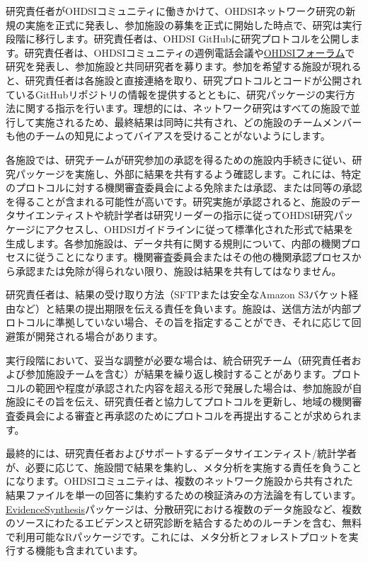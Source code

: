 \documentclass[
  11pt]{book}
\theoremstyle{definition}
\theoremstyle{definition}
\theoremstyle{definition}
\theoremstyle{definition}
\theoremstyle{remark}
\begin{document}
研究責任者がOHDSIコミュニティに働きかけて、OHDSIネットワーク研究の新規の実施を正式に発表し、参加施設の募集を正式に開始した時点で、研究は実行段階に移行します。研究責任者は、OHDSI GitHubに研究プロトコルを公開します。研究責任者は、OHDSIコミュニティの週例電話会議や\href{http://forums.ohdsi.org/}{OHDSIフォーラム}で研究を発表し、参加施設と共同研究者を募ります。参加を希望する施設が現れると、研究責任者は各施設と直接連絡を取り、研究プロトコルとコードが公開されているGitHubリポジトリの情報を提供するとともに、研究パッケージの実行方法に関する指示を行います。理想的には、ネットワーク研究はすべての施設で並行して実施されるため、最終結果は同時に共有され、どの施設のチームメンバーも他のチームの知見によってバイアスを受けることがないようにします。

各施設では、研究チームが研究参加の承認を得るための施設内手続きに従い、研究パッケージを実施し、外部に結果を共有するよう確認します。これには、特定のプロトコルに対する機関審査委員会による免除または承認、または同等の承認を得ることが含まれる可能性が高いです。研究実施が承認されると、施設のデータサイエンティストや統計学者は研究リーダーの指示に従ってOHDSI研究パッケージにアクセスし、OHDSIガイドラインに従って標準化された形式で結果を生成します。各参加施設は、データ共有に関する規則について、内部の機関プロセスに従うことになります。機関審査委員会またはその他の機関承認プロセスから承認または免除が得られない限り、施設は結果を共有してはなりません。

研究責任者は、結果の受け取り方法（SFTPまたは安全なAmazon S3バケット経由など）と結果の提出期限を伝える責任を負います。施設は、送信方法が内部プロトコルに準拠していない場合、その旨を指定することができ、それに応じて回避策が開発される場合があります。

実行段階において、妥当な調整が必要な場合は、統合研究チーム（研究責任者および参加施設チームを含む）が結果を繰り返し検討することがあります。プロトコルの範囲や程度が承認された内容を超える形で発展した場合は、参加施設が自施設にその旨を伝え、研究責任者と協力してプロトコルを更新し、地域の機関審査委員会による審査と再承認のためにプロトコルを再提出することが求められます。

最終的には、研究責任者およびサポートするデータサイエンティスト/統計学者が、必要に応じて、施設間で結果を集約し、メタ分析を実施する責任を負うことになります。OHDSIコミュニティは、複数のネットワーク施設から共有された結果ファイルを単一の回答に集約するための検証済みの方法論を有しています。\href{https://github.com/OHDSI/EvidenceSynthesis}{EvidenceSynthesis}パッケージは、分散研究における複数のデータ施設など、複数のソースにわたるエビデンスと研究診断を結合するためのルーチンを含む、無料で利用可能なRパッケージです。これには、メタ分析とフォレストプロットを実行する機能も含まれています。
\end{document}
